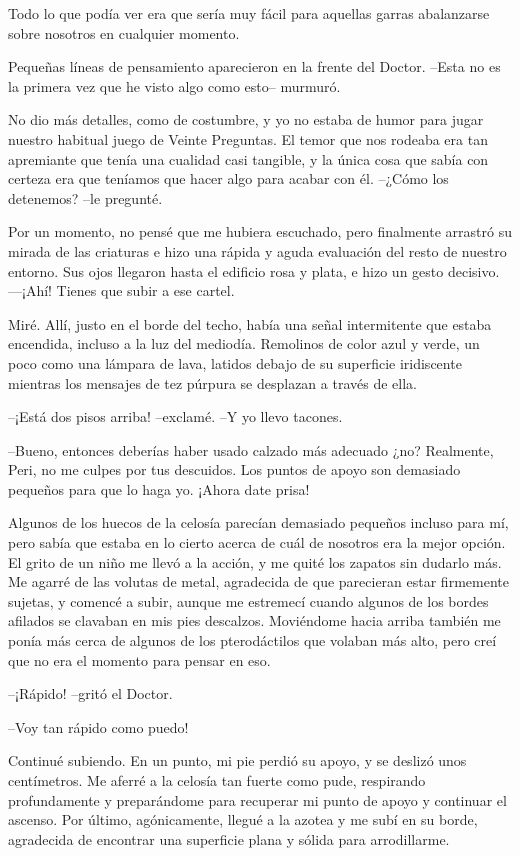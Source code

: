 Todo lo que podía ver era que sería muy fácil para aquellas garras
abalanzarse sobre nosotros en cualquier momento.

Pequeñas líneas de pensamiento aparecieron en la frente del Doctor.
--Esta no es la primera vez que he visto algo como esto-- murmuró.

No dio más detalles, como de costumbre, y yo no estaba de humor para
jugar nuestro habitual juego de Veinte Preguntas. El temor que nos
rodeaba era tan apremiante que tenía una cualidad casi tangible, y la
única cosa que sabía con certeza era que teníamos que hacer algo para
acabar con él. --¿Cómo los detenemos? --le pregunté.

Por un momento, no pensé que me hubiera escuchado, pero finalmente
arrastró su mirada de las criaturas e hizo una rápida y aguda evaluación
del resto de nuestro entorno. Sus ojos llegaron hasta el edificio rosa y
plata, e hizo un gesto decisivo. ---¡Ahí! Tienes que subir a ese cartel.

Miré. Allí, justo en el borde del techo, había una señal intermitente
que estaba encendida, incluso a la luz del mediodía. Remolinos de color
azul y verde, un poco como una lámpara de lava, latidos debajo de su
superficie iridiscente mientras los mensajes de tez púrpura se desplazan
a través de ella.

--¡Está dos pisos arriba! --exclamé. --Y yo llevo tacones.

--Bueno, entonces deberías haber usado calzado más adecuado ¿no?
Realmente, Peri, no me culpes por tus descuidos. Los puntos de apoyo son
demasiado pequeños para que lo haga yo. ¡Ahora date prisa!

Algunos de los huecos de la celosía parecían demasiado pequeños incluso
para mí, pero sabía que estaba en lo cierto acerca de cuál de nosotros
era la mejor opción. El grito de un niño me llevó a la acción, y me
quité los zapatos sin dudarlo más. Me agarré de las volutas de metal,
agradecida de que parecieran estar firmemente sujetas, y comencé a
subir, aunque me estremecí cuando algunos de los bordes afilados se
clavaban en mis pies descalzos. Moviéndome hacia arriba también me ponía
más cerca de algunos de los pterodáctilos que volaban más alto, pero
creí que no era el momento para pensar en eso.

--¡Rápido! --gritó el Doctor.

--Voy tan rápido como puedo!

Continué subiendo. En un punto, mi pie perdió su apoyo, y se deslizó
unos centímetros. Me aferré a la celosía tan fuerte como pude,
respirando profundamente y preparándome para recuperar mi punto de apoyo
y continuar el ascenso. Por último, agónicamente, llegué a la azotea y
me subí en su borde, agradecida de encontrar una superficie plana y
sólida para arrodillarme.

